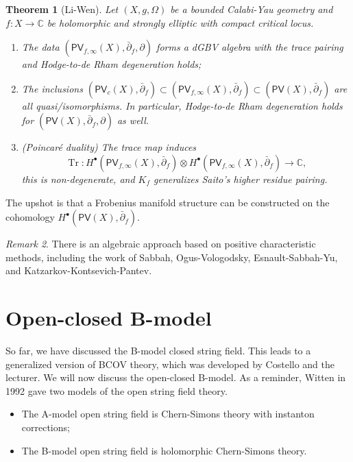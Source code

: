 \documentclass{amsart}
\newtheorem{thm}{Theorem}[section]
\theoremstyle{definition}
\theoremstyle{remark}
\newtheorem{rmk}[thm]{Remark}
\theoremstyle{plain}
\theoremstyle{definition}
\theoremstyle{remark}
\newcommand{\C}{\mathbb{C}}
\newcommand{\on}[1]{\operatorname{#1}}
\newcommand{\ms}[1]{\mathsf{#1}}
\newcommand{\1}{\mathbf{1}}
\newcommand{\2}{\mathbf{2}}
\newcommand{\3}{\mathbf{3}}
\newcommand{\dbar}{\bar{\partial}}
\begin{document}
\begin{thm}[Li-Wen]
    Let \((X, g, \Omega)\) be a bounded Calabi-Yau geometry and \(f \colon X \to \C\) be holomorphic and strongly elliptic with compact critical locus.
    \begin{enumerate}
        \item The data \((\ms{PV}_{f, \infty}(X), \dbar_f, \partial)\) forms a dGBV algebra with the trace pairing and Hodge-to-de Rham degeneration holds;
        \item The inclusions \((\ms{PV}_c(X), \dbar_f) \subset (\ms{PV}_{f, \infty}(X), \dbar_f) \subset (\ms{PV}(X), \dbar_f)\) are all quasi\-/isomorphisms. In particular, Hodge-to-de Rham degeneration holds for \((\ms{PV}(X), \dbar_f, \partial)\) as well.
        \item (Poincar\'e duality) The trace map induces
        \[ \on{Tr} \colon H^{\bullet}(\ms{PV}_{f, \infty}(X), \dbar_f) \otimes H^{\bullet}(\ms{PV}_{f, \infty}(X), \dbar_f) \to \C, \]
        this is non-degenerate, and \(K_f\) generalizes Saito's higher residue pairing.
    \end{enumerate}
\end{thm}

The upshot is that a Frobenius manifold structure can be constructed on the cohomology \(H^{\bullet}(\ms{PV}(X), \dbar_f)\).

\begin{rmk}
    There is an algebraic approach based on positive characteristic methods, including the work of Sabbah, Ogus-Vologodsky, Esnault-Sabbah-Yu, and Katzarkov-Kontsevich-Pantev.
\end{rmk}

\section{Open-closed B-model}%
\label{sec:Open-closed B-model}

So far, we have discussed the B-model closed string field. This leads to a generalized version of BCOV theory, which was developed by Costello and the lecturer. We will now discuss the open-closed B-model. As a reminder, Witten in 1992 gave two models of the open string field theory.
\begin{itemize}
    \item The A-model open string field is Chern-Simons theory with instanton corrections;
    \item The B-model open string field is holomorphic Chern-Simons theory.
\end{itemize}
\end{document}
